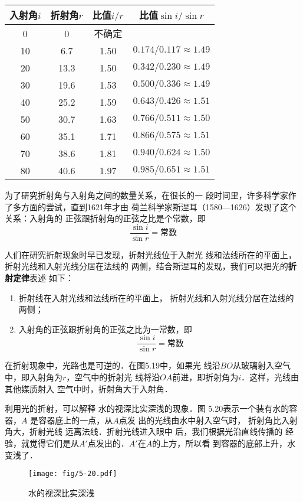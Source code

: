 \begin{center}
\begin{tabular}{cccc}
\hline
    入射角$i$ & 折射角$r$ & 比值$i/r$ & 比值$\sin i/\sin r$\\
\hline
0  &  0  &  不确定 &    \\
10  &  6.7  &  1.50 &  $0.174/0.117\approx 1.49$  \\
20  &  13.3  &  1.50 &   $0.342/0.230\approx 1.49$ \\
30  &  19.6  &  1.53 &  $0.500/0.336\approx 1.49$  \\
40  &  25.2  &  1.59 &  $0.643/0.426\approx 1.51$  \\
50  &  30.7  &  1.63 &  $0.766/0.511\approx 1.50$  \\
60  &  35.1  &  1.71 &  $0.866/0.575\approx 1.51$  \\
70  &  38.6  &  1.81 &  $0.940/0.624\approx 1.50$  \\
80  &  40.6  &  1.97 &  $0.985/0.651\approx 1.51$  \\
\hline
    \end{tabular}
\end{center}

为了研究折射角与入射角之间的数量关系，在很长的一
段时间里，许多科学家作了多方面的尝试，直到1621年才由
荷兰科学家斯涅耳（1580—1626）发现了这个关系：入射角的
正弦跟折射角的正弦之比是个常数，即
\[\frac{\sin i}{\sin r}=\text{常数}\]

人们在研究折射现象时早已发现，折射光线位于入射光
线和法线所在的平面上，折射光线和入射光线分居在法线的
两侧，结合斯涅耳的发现，我们可以把光的\textbf{折射定律}表述
如下：

\begin{enumerate}
    \item 折射线在入射光线和法线所在的平面上，
折射光线和入射光线分居在法线的两侧；
\item 入射角的正弦跟折射角的正弦之比为一常数，即
\[\frac{\sin i}{\sin r}=\text{常数}\]
\end{enumerate} 

在折射现象中，光路也是可逆的．在图5.19中，如果光
线沿$BO$从玻璃射入空气中，即入射角为$r$，空气中的折射光
线将沿$OA$前进，即折射角为$i$．这样，光线由其他媒质射入
空气中时，折射角大于入射角．

利用光的折射，可以解释
水的视深比实深浅的现象．图
5.20表示一个装有水的容器，$A$
是容器底上的一点，从$A$点发
出的光线由水中射入空气时，
折射角比入射角大，折射光线
远离法线．折射光线进入眼中
后，我们根据光沿直线传播的
经验，就觉得它们是从$A'$点发出的．$A'$在$A$的上方，所以看
到容器的底部上升，水变浅了．
\begin{figure}[htp]\centering
    \texttt{[image: fig/5-20.pdf]}
    \caption{水的视深比实深浅}
    \end{figure}


